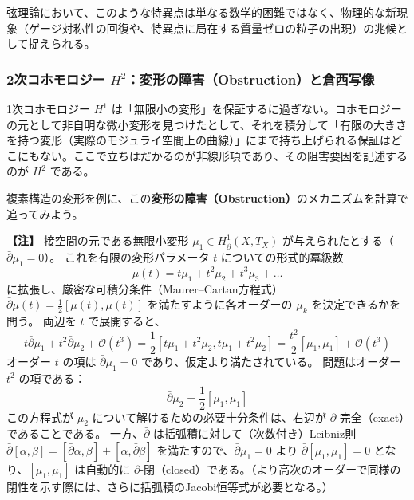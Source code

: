 \documentclass[uplatex, dvipdfmx, book]{jsbook}
\let\origsubsubsection\subsubsection
\renewcommand{\subsection}{\origsubsubsection}
\renewcommand{\subsubsection}{\paragraph}
\newenvironment{note}{\vspace{1ex}\par\footnotesize\noindent\textbf{【注】}}{\par\vspace{1ex}}
\begin{document}
弦理論において、このような特異点は単なる数学的困難ではなく、物理的な新現象（ゲージ対称性の回復や、特異点に局在する質量ゼロの粒子の出現）の兆候として捉えられる。

\subsection{2次コホモロジー $H^2$：変形の障害（Obstruction）と倉西写像}

1次コホモロジー $H^1$ は「無限小の変形」を保証するに過ぎない。コホモロジーの元として非自明な微小変形を見つけたとして、それを積分して「有限の大きさを持つ変形（実際のモジュライ空間上の曲線）」にまで持ち上げられる保証はどこにもない。ここで立ちはだかるのが非線形項であり、その阻害要因を記述するのが $H^2$ である。

複素構造の変形を例に、この\textbf{変形の障害（Obstruction）}のメカニズムを計算で追ってみよう。

\begin{note}
接空間の元である無限小変形 $\mu_1 \in H_{\bar{\partial}}^1(X, T_X)$ が与えられたとする（$\bar{\partial} \mu_1 = 0$）。
これを有限の変形パラメータ $t$ についての形式的冪級数
\begin{equation}
    \mu(t) = t \mu_1 + t^2 \mu_2 + t^3 \mu_3 + \dots
\end{equation}
に拡張し、厳密な可積分条件（Maurer--Cartan方程式）$\bar{\partial} \mu(t) = \frac{1}{2}[\mu(t), \mu(t)]$ を満たすように各オーダーの $\mu_k$ を決定できるかを問う。
両辺を $t$ で展開すると、
\begin{equation}
    t \bar{\partial} \mu_1 + t^2 \bar{\partial} \mu_2 + \mathcal{O}(t^3) = \frac{1}{2} [t \mu_1 + t^2 \mu_2, t \mu_1 + t^2 \mu_2] = \frac{t^2}{2} [\mu_1, \mu_1] + \mathcal{O}(t^3)
\end{equation}
オーダー $t$ の項は $\bar{\partial} \mu_1 = 0$ であり、仮定より満たされている。
問題はオーダー $t^2$ の項である：
\begin{equation}
    \bar{\partial} \mu_2 = \frac{1}{2} [\mu_1, \mu_1]
\end{equation}
この方程式が $\mu_2$ について解けるための必要十分条件は、右辺が $\bar{\partial}$-完全（exact）であることである。
一方、$\bar{\partial}$ は括弧積に対して（次数付き）Leibniz則 $\bar{\partial}[\alpha, \beta] = [\bar{\partial}\alpha, \beta] \pm [\alpha, \bar{\partial}\beta]$ を満たすので、$\bar{\partial}\mu_1 = 0$ より $\bar{\partial} [\mu_1, \mu_1] = 0$ となり、$[\mu_1, \mu_1]$ は自動的に $\bar{\partial}$-閉（closed）である。（より高次のオーダーで同様の閉性を示す際には、さらに括弧積のJacobi恒等式が必要となる。）
\end{note}
\end{document}
